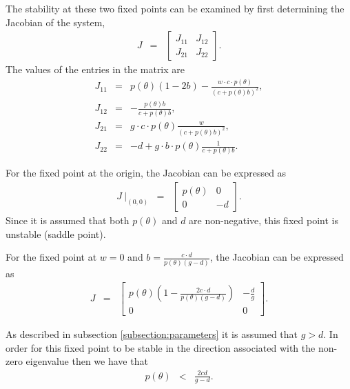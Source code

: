 \documentclass[review,authoryear]{elsarticle}
\begin{document}
The stability at these two fixed points can be examined by first
determining the Jacobian of the system,
\begin{eqnarray*}
  J & = & \left[
          \begin{array}{rr}
            J_{11} & J_{12} \\
            J_{21} & J_{22}
          \end{array}
          \right].
\end{eqnarray*}
The values of the entries in the matrix are
\begin{eqnarray*}
  J_{11} & = & p(\theta)\left(1-2b\right) -
               \frac{w\cdot c \cdot p(\theta)}{\left( c + p(\theta)b \right)^2}, \\
  J_{12} & = & -\frac{p(\theta)b}{c+p(\theta)b}, \\
  J_{21} & = & g\cdot c \cdot  p(\theta) \frac{w}{\left(c+p(\theta)b\right)^2}, \\
  J_{22} & = & -d + g\cdot b \cdot  p(\theta) \frac{1}{c+p(\theta)b}.
\end{eqnarray*}

For the fixed point at the origin, the Jacobian can be expressed as 
\begin{eqnarray*}
  J~\bigg|_{(0,0)} & = & \left[
          \begin{array}{rr}
            p(\theta) & 0 \\
            0 & -d
          \end{array}
          \right].
\end{eqnarray*}
Since it is assumed that both $p(\theta)$ and $d$ are non-negative, this fixed point  is unstable  (saddle point).

For the fixed point at $w=0$ and
$b=\frac{c\cdot d}{p(\theta)\left(g - d\right)}$, the Jacobian can be
expressed as 
\begin{eqnarray*}
  J & = & \left[
          \begin{array}{cc}
            p(\theta)\left( 1 -
            \frac{2c\cdot d}{p(\theta)(g-d)} \right) & -\frac{d}{g} \\
            0 & 0
          \end{array}
          \right].
\end{eqnarray*}

As described in subsection \ref{subsection:parameters} it is assumed
that $g>d$. In order for this fixed point to be stable in the
direction associated with the non-zero eigenvalue then we have that
\begin{eqnarray*}
  p(\theta) & < & \frac{2cd}{g-d}.
\end{eqnarray*}
\end{document}
